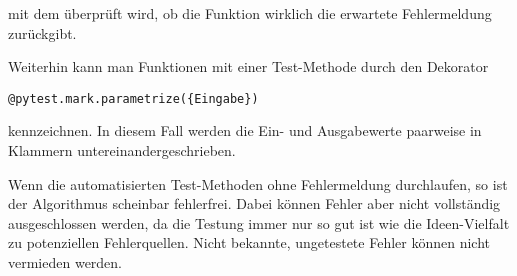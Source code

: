 mit dem überprüft wird, ob die Funktion wirklich die erwartete Fehlermeldung zurückgibt.

Weiterhin kann man Funktionen mit einer Test-Methode durch den Dekorator

\begin{verbatim}
@pytest.mark.parametrize({Eingabe})
\end{verbatim}

kennzeichnen. In diesem Fall werden die Ein- und Ausgabewerte paarweise in Klammern untereinandergeschrieben.

Wenn die automatisierten Test-Methoden ohne Fehlermeldung durchlaufen, so ist der Algorithmus scheinbar fehlerfrei. Dabei können Fehler aber nicht vollständig ausgeschlossen werden, da die Testung immer nur so gut ist wie die Ideen-Vielfalt zu potenziellen Fehlerquellen. Nicht bekannte, ungetestete Fehler können nicht vermieden werden.
